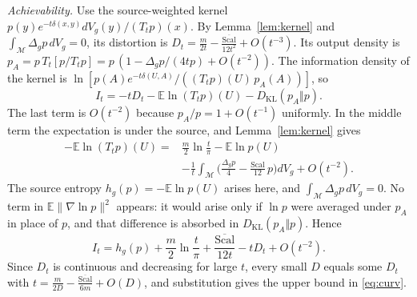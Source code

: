 \documentclass[10pt,journal]{IEEEtran}
\newcommand{\E}{\mathbb E}
\newcommand{\M}{\mathcal M}
\newcommand{\KL}{D_{\mathrm{KL}}}
\begin{document}
\emph{Achievability.} Use the source-weighted kernel $p(y)e^{-t\delta(x,y)}dV_g(y)/(T_tp)(x)$. By Lemma~\ref{lem:kernel} and $\int_\M\Delta_gp\,dV_g=0$, its distortion is $D_t=\frac m{2t}-\frac{\overline{\mathrm{Scal}}}{12t^2}+O(t^{-3})$. Its output density is $p_A=p\,T_t[p/T_tp]=p\,(1-\Delta_gp/(4tp)+O(t^{-2}))$. The information density of the kernel is $\ln[p(A)e^{-t\delta(U,A)}/((T_tp)(U)\,p_A(A))]$, so
\begin{equation}
 I_t=-tD_t-\E\ln(T_tp)(U)-\KL(p_A\Vert p).
\end{equation}
The last term is $O(t^{-2})$ because $p_A/p=1+O(t^{-1})$ uniformly. In the middle term the expectation is under the source, and Lemma~\ref{lem:kernel} gives
\begin{align}
 -\E\ln(T_tp)(U)={}&\frac m2\ln\frac t\pi-\E\ln p(U)\nonumber\\
 &-\frac1t\int_\M\Big(\frac{\Delta_gp}4-\frac{\mathrm{Scal}}{12}\,p\Big)dV_g+O(t^{-2}).
\end{align}
The source entropy $h_g(p)=-\E\ln p(U)$ arises here, and $\int_\M\Delta_gp\,dV_g=0$. No term in $\E\|\nabla\ln p\|^2$ appears: it would arise only if $\ln p$ were averaged under $p_A$ in place of $p$, and that difference is absorbed in $\KL(p_A\Vert p)$. Hence
\begin{equation}
 I_t=h_g(p)+\frac m2\ln\frac t\pi+\frac{\overline{\mathrm{Scal}}}{12t}-tD_t+O(t^{-2}).
\end{equation} Since $D_t$ is continuous and decreasing for large $t$, every small $D$ equals some $D_t$ with $t=\frac m{2D}-\frac{\overline{\mathrm{Scal}}}{6m}+O(D)$, and substitution gives the upper bound in \eqref{eq:curv}.


\end{document}
